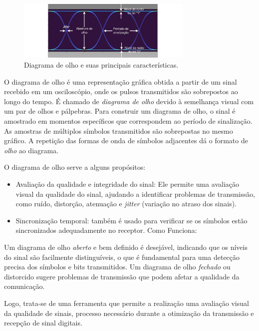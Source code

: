\documentclass[12pt,addpoints]{exam}
\begin{document}
\begin{figure}[h]
        \centering
        \includegraphics[width=0.75\textwidth]{Figuras/EyeDiagram.png}
        \caption{Diagrama de olho e suas principais características.}
        \label{fig:eye}
\end{figure}

O diagrama de olho é uma representação gráfica obtida a partir de um sinal recebido em um osciloscópio, onde os pulsos transmitidos são sobrepostos ao longo do tempo. É chamado de \textit{diagrama de olho} devido à semelhança visual com um par de olhos e pálpebras. Para construir um diagrama de olho, o sinal é amostrado em momentos específicos que correspondem ao período de sinalização. As amostras de múltiplos símbolos transmitidos são sobrepostas no mesmo gráfico. A repetição das formas de onda de símbolos adjacentes dá o formato de \textit{olho} ao diagrama.

O diagrama de olho serve a alguns propósitos:

\begin{itemize}
\item Avaliação da qualidade e integridade do sinal: Ele permite uma avaliação visual da qualidade do sinal, ajudando a identificar problemas de transmissão, como ruído, distorção, atenuação e \textit{jitter} (variação no atraso dos sinais).

\item Sincronização temporal: também é usado para verificar se os símbolos estão sincronizados adequadamente no receptor.
Como Funciona:
\end{itemize}

Um diagrama de olho \textit{aberto} e bem definido é desejável, indicando que os níveis do sinal são facilmente distinguíveis, o que é fundamental para uma detecção precisa dos símbolos e bits transmitidos. Um diagrama de olho \textit{fechado} ou distorcido sugere problemas de transmissão que podem afetar a qualidade da comunicação.

Logo, trata-se de uma ferramenta que permite a realização uma avaliação visual da qualidade de sinais, processo necessário durante a otimização da transmissão e recepção de sinal digitais.
\end{document}
